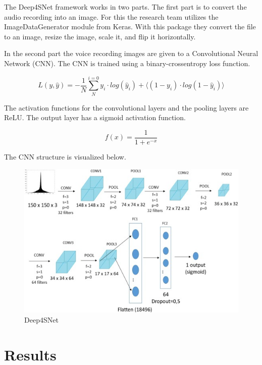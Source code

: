 \documentclass[]{article}
\begin{document}
The Deep4SNet framework works in two parts.
The first part is to convert the audio recording into an image.
For this the research team utilizes the ImageDataGenerator module from Keras.
With this package they convert the file to an image, resize the image, scale it, and flip it horizontally.

In the second part the voice recording images are given to a Convolutional Neural Network (CNN). 
The CNN is trained using a binary-crossentropy loss function.

\begin{equation}
	L(y,\hat{y}) = - \frac{1}{N} \sum_{N}^{i=0} y_i \cdot log(\hat{y}_i) + 
	\langle(1-y_i) \cdot log(1-\hat{y}_i) \rangle
\end{equation}

The activation functions for the convolutional layers and the pooling layers are ReLU.
The output layer has a sigmoid activation function.

\begin{equation}
	f(x) = \frac{1}{1+e^{-x}}
\end{equation}

The CNN structure is visualized below.

\begin{figure}[h]
	\centering
	\includegraphics[width=\textwidth]{CNN}
	\caption{Deep4SNet \cite{Ballesteros2021}}
\end{figure}


\section{Results}
\end{document}
